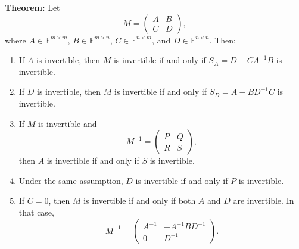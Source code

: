 \documentclass[a4paper,11pt,abstract=true]{scrartcl}
\theoremstyle{dotlessP}
\theoremstyle{dotlessS}
\theoremstyle{remark}
\theoremstyle{definition}
\begin{document}
\begin{problem_box}
\textbf{Theorem:} Let
\[
M=\begin{pmatrix}A&B\\C&D\end{pmatrix},
\]
where $A\in\mathbb{F}^{m\times m}$, $B\in\mathbb{F}^{m\times n}$,
$C\in\mathbb{F}^{n\times m}$, and $D\in\mathbb{F}^{n\times n}$.
Then:
\begin{enumerate}
    \item If $A$ is invertible, then $M$ is invertible if and only if
    $S_A=D-CA^{-1}B$ is invertible.
    \item If $D$ is invertible, then $M$ is invertible if and only if
    $S_D=A-BD^{-1}C$ is invertible.
    \item If $M$ is invertible and
    \[
    M^{-1}=\begin{pmatrix}P&Q\\R&S\end{pmatrix},
    \]
    then $A$ is invertible if and only if $S$ is invertible.
    \item Under the same assumption, $D$ is invertible if and only if
    $P$ is invertible.
    \item If $C=0$, then $M$ is invertible if and only if both $A$ and
    $D$ are invertible. In that case,
    \[
    M^{-1}=\begin{pmatrix}
    A^{-1}&-A^{-1}BD^{-1}\\
    0&D^{-1}
    \end{pmatrix}.
    \]
\end{enumerate}
\end{problem_box}
\end{document}
